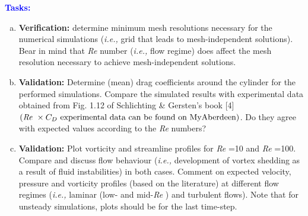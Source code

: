 \documentclass[12pts,a4paper,amsmath,amssymb,floatfix]{article}%
\newcommand{\blue}{\textcolor{blue}}
\newcommand{\ie}{{\it i.e., }}
\newcommand\Rey{\mbox{\textit{Re}}\,\,}
\begin{document}
     \begin{shaded}
        \begin{center} \blue{\bf Tasks: } \end{center}
        \begin{enumerate}[a)]
           \item {\bf Verification:} determine minimum mesh resolutions necessary for the numerical simulations (\ie grid that leads to mesh-independent solutions). Bear in mind that \Rey number (\ie flow regime) does affect the mesh resolution necessary to achieve mesh-independent solutions.
           \item {\bf Validation:} Determine (mean) drag coefficients around the cylinder for the performed simulations. Compare the simulated results with experimental data obtained from Fig. 1.12 of Schlichting \& Gersten's book [4] $\left(\text{\Rey}\times C_{D} \text{ experimental data can be found on MyAberdeen}\right)$. Do they agree with expected values according to the \Rey numbers?
           \item {\bf Validation:} Plot vorticity and streamline profiles for \Rey=10 and \Rey=100. Compare and discuss flow behaviour (\ie development of vortex shedding as a result of fluid instabilities) in both cases. Comment on expected velocity, pressure and vorticity profiles (based on the literature) at different flow regimes (\ie laminar (low- and mid-\Rey) and turbulent flows). Note that for unsteady simulations, plots should be for the last time-step.
        \end{enumerate}
     \end{shaded}
\end{document}
